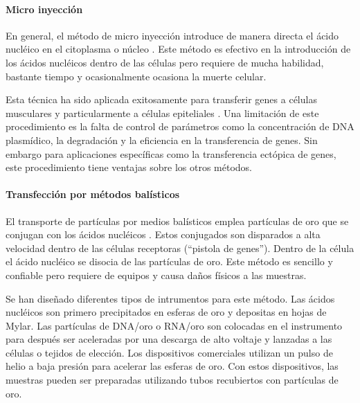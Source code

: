 \documentclass[fleqn,10pt]{SelfArx} %
\begin{document}
\paragraph*{Micro inyección}
En general, el método de micro inyección introduce de manera directa el ácido nucléico en el citoplasma o núcleo \cite{Martinou:1995aa, Ikeda:1995aa}. Este método es efectivo en la introducción de los ácidos nucléicos dentro de las células pero requiere de mucha habilidad, bastante tiempo y ocasionalmente ocasiona la muerte celular. 

Esta técnica ha sido aplicada exitosamente para transferir genes a células musculares y particularmente a células epiteliales \cite{Sawamura:2002aa, Davis:1993aa}. Una limitación de este procedimiento es la falta de control de parámetros como la concentración de DNA plasmídico, la degradación y la eficiencia en la transferencia de genes. Sin embargo para aplicaciones específicas como la transferencia ectópica de genes, este procedimiento tiene ventajas sobre los otros métodos.

\paragraph*{Transfección por métodos balísticos}
El transporte de partículas por medios balísticos emplea partículas de oro que se conjugan con los ácidos nucléicos \cite{Lo:1994aa, OBrien:2006aa}. Estos conjugados son disparados a alta velocidad dentro de las células receptoras (``pistola de genes''). Dentro de la célula el ácido nucléico se disocia de las partículas de oro.  Este método es sencillo y confiable pero requiere de equipos y causa daños físicos a las muestras. 

Se han diseñado diferentes tipos de intrumentos para este método. Las ácidos nucléicos son primero precipitados en esferas de oro y depositas en hojas de Mylar. Las partículas de DNA/oro o RNA/oro son colocadas en el instrumento para después ser aceleradas por una descarga de alto voltaje y lanzadas a las células o tejidos de elección. Los dispositivos comerciales utilizan un pulso de helio a baja presión para acelerar las esferas de oro. Con estos dispositivos, las muestras pueden ser preparadas utilizando tubos recubiertos con partículas de oro. 
\end{document}
